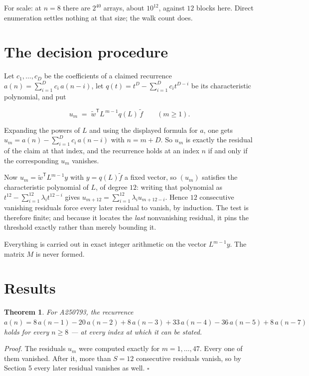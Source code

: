 \documentclass[11pt]{article}
\newtheorem{theorem}{Theorem}
\theoremstyle{definition}
\begin{document}
For scale: at $n = 8$ there are $2^{40}$ arrays, about $10^{12}$, against $12$ blocks here. Direct enumeration settles nothing at that size; the walk count does.

\section{The decision procedure}

Let $c_1,\dots,c_D$ be the coefficients of a claimed recurrence $a(n) = \sum_{i=1}^{D} c_i\,a(n-i)$, let $q(t) = t^{D} - \sum_{i=1}^{D} c_i t^{D-i}$ be its characteristic polynomial, and put

\[u_m \;=\; \tilde w^{\mathsf T} L^{\,m-1} q(L)\,\tilde f \qquad (m \ge 1).\]

Expanding the powers of $L$ and using the displayed formula for $a$, one gets $u_m = a(n) - \sum_{i=1}^{D} c_i\,a(n-i)$ with $n = m + D$. So $u_m$ is exactly the residual of the claim at that index, and the recurrence holds at an index $n$ if and only if the corresponding $u_m$ vanishes.

Now $u_m = \tilde w^{\mathsf T} L^{m-1} y$ with $y = q(L)\tilde f$ a fixed vector, so $(u_m)$ satisfies the characteristic polynomial of $L$, of degree $12$: writing that polynomial as $t^{12} - \sum_{i=1}^{12} \lambda_i t^{12-i}$ gives $u_{m+12} = \sum_{i=1}^{12} \lambda_i u_{m+12-i}$. Hence $12$ consecutive vanishing residuals force every later residual to vanish, by induction. The test is therefore finite; and because it locates the {\itshape last} nonvanishing residual, it pins the threshold exactly rather than merely bounding it.

Everything is carried out in exact integer arithmetic on the vector $L^{m-1}y$. The matrix $M$ is never formed.

\section{Results}

\begin{theorem} For A250793, the recurrence $a(n) = 8\,a(n-1) - 20\,a(n-2) + 8\,a(n-3) + 33\,a(n-4) - 36\,a(n-5) + 8\,a(n-7)$ holds for every $n \ge 8$ --- at every index at which it can be stated.\end{theorem}

{\itshape Proof.} The residuals $u_m$ were computed exactly for $m = 1,\dots,47$. Every one of them vanished. After it, more than $S = 12$ consecutive residuals vanish, so by Section 5 every later residual vanishes as well. $\square$
\end{document}
